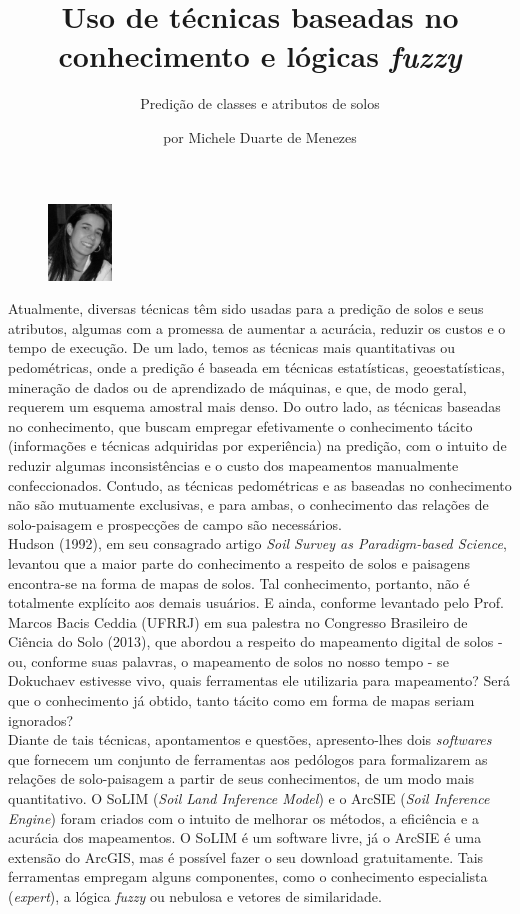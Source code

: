 \title{Uso de técnicas baseadas no conhecimento e lógicas \emph{fuzzy}}
\subtitle{Predição de classes e atributos de solos}
\author{por Michele Duarte de Menezes}
\maketitle
\begin{figure}
\includegraphics[width=0.15\textwidth]{figuras/foto-michele.png}
\end{figure}
Atualmente, diversas técnicas têm sido usadas para a predição de solos e seus atributos, algumas com a promessa de aumentar a acurácia, reduzir os custos e o tempo de execução. De um lado, temos as técnicas mais quantitativas ou pedométricas, onde a predição é baseada em técnicas estatísticas, geoestatísticas, mineração de dados ou de aprendizado de máquinas, e que, de modo geral, requerem um esquema amostral mais denso. Do outro lado, as técnicas baseadas no conhecimento, que buscam empregar efetivamente o conhecimento tácito (informações e técnicas adquiridas por experiência) na predição, com o intuito de reduzir algumas inconsistências e o custo dos mapeamentos manualmente confeccionados. Contudo, as técnicas pedométricas e as baseadas no conhecimento não são mutuamente exclusivas, e para ambas, o conhecimento das relações de solo-paisagem e prospecções de campo são necessários.\\
Hudson (1992), em seu consagrado artigo \emph{Soil Survey as Paradigm-based Science}, levantou que a maior parte do conhecimento a respeito de solos e paisagens encontra-se na forma de mapas de solos. Tal conhecimento, portanto, não é totalmente explícito aos demais usuários. E ainda, conforme levantado pelo Prof. Marcos Bacis Ceddia (UFRRJ) em sua palestra no Congresso Brasileiro de Ciência do Solo (2013), que abordou a respeito do mapeamento digital de solos - ou, conforme suas palavras, o mapeamento de solos no nosso tempo - se Dokuchaev estivesse vivo, quais ferramentas ele utilizaria para mapeamento? Será que o conhecimento já obtido, tanto tácito como em forma de mapas seriam ignorados?\\
Diante de tais técnicas, apontamentos e questões, apresento-lhes dois \emph{softwares} que fornecem um conjunto de ferramentas aos pedólogos para formalizarem as relações de solo-paisagem a partir de seus conhecimentos, de um modo mais quantitativo. O SoLIM (\emph{Soil Land Inference Model}) e o ArcSIE (\emph{Soil Inference Engine}) foram criados com o intuito de melhorar os métodos, a eficiência e a acurácia dos mapeamentos. O SoLIM é um software livre, já o ArcSIE é uma extensão do ArcGIS, mas é possível fazer o seu download gratuitamente. Tais ferramentas empregam alguns componentes, como o conhecimento especialista (\emph{expert}), a lógica \emph{fuzzy} ou nebulosa e vetores de similaridade.\\
